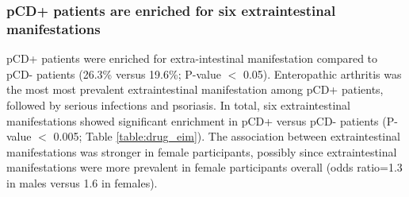 \subsubsection{pCD+ patients are enriched for six extraintestinal manifestations}
pCD+ patients were enriched for extra-intestinal manifestation compared to pCD- patients (26.3\% versus 19.6\%; P-value $<$ 0.05). Enteropathic arthritis was the most most prevalent extraintestinal manifestation among pCD+ patients, followed by serious infections and psoriasis. In total, six extraintestinal manifestations showed significant enrichment in pCD+ versus pCD- patients (P-value $<$ 0.005; Table  \ref{table:drug_eim}). The association between extraintestinal manifestations was stronger in female participants, possibly since extraintestinal manifestations were more prevalent in female participants overall (odds ratio=1.3 in males versus 1.6 in females). 
